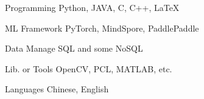 

\begin{cvskills}

    \cvskill
    {Programming} %
    {Python, JAVA, C, C++, LaTeX} %

    \cvskill
    {ML Framework} %
    {PyTorch, MindSpore, PaddlePaddle} %

    \cvskill
    {Data Manage} %
    {SQL and some NoSQL} %

    \cvskill
    {Lib. or Tools} %
    {OpenCV, PCL, MATLAB, etc.} %

    \cvskill
    {Languages} %
    {Chinese, English} %

\end{cvskills}
